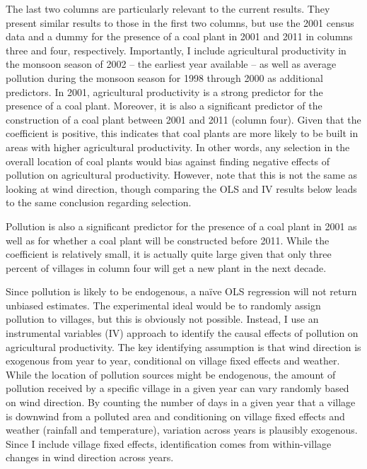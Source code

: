 \documentclass[
]{article}
\begin{document}
The last two columns are particularly relevant to the current results. They present similar results to those in the first two columns, but use the 2001 census data and a dummy for the presence of a coal plant in 2001 and 2011 in columns three and four, respectively. Importantly, I include agricultural productivity in the monsoon season of 2002 -- the earliest year available -- as well as average pollution during the monsoon season for 1998 through 2000 as additional predictors. In 2001, agricultural productivity is a strong predictor for the presence of a coal plant. Moreover, it is also a significant predictor of the construction of a coal plant between 2001 and 2011 (column four). Given that the coefficient is positive, this indicates that coal plants are more likely to be built in areas with higher agricultural productivity. In other words, any selection in the overall location of coal plants would bias against finding negative effects of pollution on agricultural productivity. However, note that this is not the same as looking at wind direction, though comparing the OLS and IV results below leads to the same conclusion regarding selection.

Pollution is also a significant predictor for the presence of a coal plant in 2001 as well as for whether a coal plant will be constructed before 2011. While the coefficient is relatively small, it is actually quite large given that only three percent of villages in column four will get a new plant in the next decade.

Since pollution is likely to be endogenous, a naïve OLS regression will not return unbiased estimates. The experimental ideal would be to randomly assign pollution to villages, but this is obviously not possible. Instead, I use an instrumental variables (IV) approach to identify the causal effects of pollution on agricultural productivity. The key identifying assumption is that wind direction is exogenous from year to year, conditional on village fixed effects and weather. While the location of pollution sources might be endogenous, the amount of pollution received by a specific village in a given year can vary randomly based on wind direction. By counting the number of days in a given year that a village is downwind from a polluted area and conditioning on village fixed effects and weather (rainfall and temperature), variation across years is plausibly exogenous. Since I include village fixed effects, identification comes from within-village changes in wind direction across years.
\end{document}
